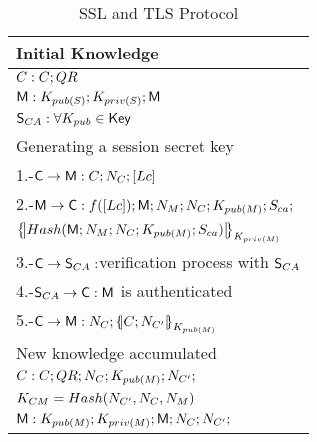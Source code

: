 \begin{table}[htb]
\footnotesize
\begin{center}
\caption{SSL and TLS Protocol}
\label{table:sslAndtlsProtocol}
\begin{tabular}{|l|}
\hline
  Initial Knowledge                                                                     \\\hline
            $C:C; QR$                                                                  \\ 
            $\textsf{M}: K_{pub(S)}; K_{priv(S)} ; \textsf{M}$                 \\ 
            $\textsf{S}_{CA}: \forall K_{pub}\in \textsf{Key}\;$                                   \\ \hline 
  Generating a session secret key                                                          \\
            1.-$\textsf{C}\rightarrow \textsf{M}:C; N_{C}; [Lc]$                         \\ 
            2.-$\textsf{M}\rightarrow \textsf{C}: f([Lc]); \textsf{M} ; N_{M}; N_{C}; 
                 K_{pub(M)}; S_{ca}; $                                            \\ 
            \hspace{3mm} $\fat{Hash(\Server\lnk N_{\serverW}\lnk N_{C}\lnk K_{pub(\serverW)}\lnk 
                        S_{ca})}_{K_{priv(\serverW)}}$                                          \\ 
            3.-$\textsf{C}\rightarrow \textsf{S}_{CA}:$verification process with $\textsf{S}_{CA}$             \\ 
            4.-$\textsf{S}_{CA} \rightarrow \textsf{C}: \textsf{M}$ is authenticated                     \\ 
            5.-$\Client\rightarrow \Server: N_{C}\lnk\fat{C\lnk N_{C'}}_{K_{pub(\serverW)}}$      \\ \hline
  New knowledge accumulated                                                               \\
            $C:C; QR ; N_{C}; K_{pub(M)}; N_{C'} ; $                                    \\
            \hspace{5mm} $K_{CM}=Hash(N_{C'},N_{C},N_{M})$                              \\ 
            $\textsf{M}: K_{pub(M)}; K_{priv(M)}; \textsf{M}; N_{C}; N_{C'};$    \\

\end{tabular}
\end{center}
\end{table}

